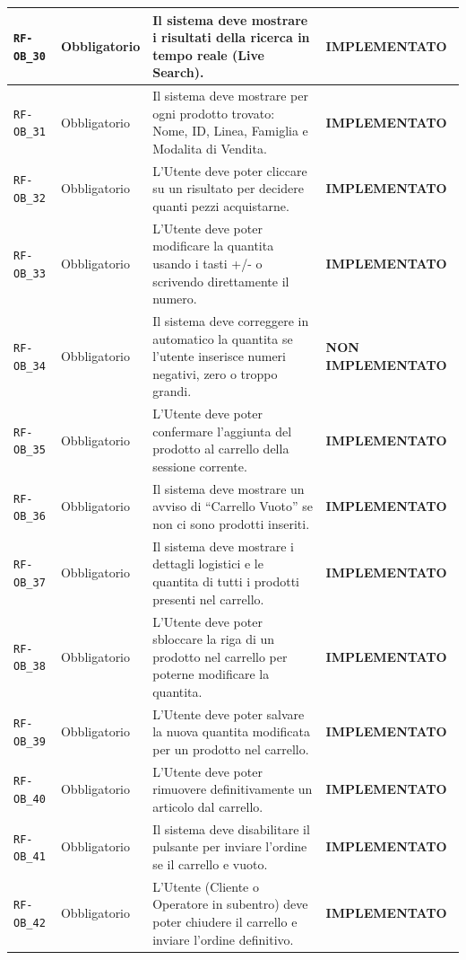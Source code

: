 \documentclass[a4paper, 11pt, oneside]{scrartcl}
\begin{document}
\begin{longtable}{|>{\raggedright\arraybackslash}p{}|>{\raggedright\arraybackslash}p{}|>{\raggedright\arraybackslash}p{}|>{\raggedright\arraybackslash}p{}|}
    \hline
    \texttt{RF-OB\_30} & Obbligatorio & Il sistema deve mostrare i risultati della ricerca in tempo reale (Live Search). & \textbf{IMPLEMENTATO} \\
    \hline
    \texttt{RF-OB\_31} & Obbligatorio & Il sistema deve mostrare per ogni prodotto trovato: Nome, ID, Linea, Famiglia e Modalita di Vendita. & \textbf{IMPLEMENTATO} \\
    \hline
    \texttt{RF-OB\_32} & Obbligatorio & L'Utente deve poter cliccare su un risultato per decidere quanti pezzi acquistarne. & \textbf{IMPLEMENTATO} \\
    \hline
    \texttt{RF-OB\_33} & Obbligatorio & L'Utente deve poter modificare la quantita usando i tasti +/- o scrivendo direttamente il numero. & \textbf{IMPLEMENTATO} \\
    \hline
    \texttt{RF-OB\_34} & Obbligatorio & Il sistema deve correggere in automatico la quantita se l'utente inserisce numeri negativi, zero o troppo grandi. & \textbf{NON IMPLEMENTATO} \\
    \hline
    \texttt{RF-OB\_35} & Obbligatorio & L'Utente deve poter confermare l'aggiunta del prodotto al carrello della sessione corrente. & \textbf{IMPLEMENTATO} \\
    \hline
    \texttt{RF-OB\_36} & Obbligatorio & Il sistema deve mostrare un avviso di ``Carrello Vuoto'' se non ci sono prodotti inseriti. & \textbf{IMPLEMENTATO} \\
    \hline
    \texttt{RF-OB\_37} & Obbligatorio & Il sistema deve mostrare i dettagli logistici e le quantita di tutti i prodotti presenti nel carrello. & \textbf{IMPLEMENTATO} \\
    \hline
    \texttt{RF-OB\_38} & Obbligatorio & L'Utente deve poter sbloccare la riga di un prodotto nel carrello per poterne modificare la quantita. & \textbf{IMPLEMENTATO} \\
    \hline
    \texttt{RF-OB\_39} & Obbligatorio & L'Utente deve poter salvare la nuova quantita modificata per un prodotto nel carrello. & \textbf{IMPLEMENTATO} \\
    \hline
    \texttt{RF-OB\_40} & Obbligatorio & L'Utente deve poter rimuovere definitivamente un articolo dal carrello. & \textbf{IMPLEMENTATO} \\
    \hline
    \texttt{RF-OB\_41} & Obbligatorio & Il sistema deve disabilitare il pulsante per inviare l'ordine se il carrello e vuoto. & \textbf{IMPLEMENTATO} \\
    \hline
    \texttt{RF-OB\_42} & Obbligatorio & L'Utente (Cliente o Operatore in subentro) deve poter chiudere il carrello e inviare l'ordine definitivo. & \textbf{IMPLEMENTATO} \\

\end{longtable}
\end{document}
